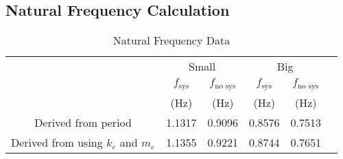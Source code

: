 \subsection{Natural Frequency Calculation}
\begin{table}[H]
    \centering
    \caption{Natural Frequency Data}
    \label{tab:natural_frequency_data}
    \begin{tabular}{cccccc}
    \toprule
        & \multicolumn{2}{c}{Small} & \multicolumn{2}{c}{Big} \\
        \cmidrule(lr){2-3} \cmidrule(lr){4-5}
        & $f_{\text{sys}}$ & $f_{\text{no sys}}$ & $f_{\text{sys}}$ & $f_{\text{no sys}}$ \\
        & (Hz) & (Hz) & (Hz) & (Hz) \\
        \midrule
        Derived from period & 1.1317 & 0.9096 & 0.8576 & 0.7513 \\
        Derived from using $k_e$ and $m_e$ & 1.1355 & 0.9221 & 0.8744 & 0.7651 \\
        \bottomrule
    \end{tabular}
\end{table}

